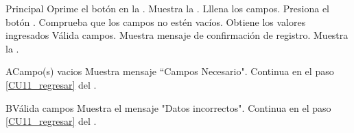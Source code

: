     \begin{UCtrayectoria}{Principal}
    \UCpaso[\UCactor] Oprime el botón  en la .
    \UCpaso Muestra la . 
    \UCpaso[\UCactor] Lllena los campos. \label{CU11_regresar}  
    \UCpaso[\UCactor] Presiona el botón .
    \UCpaso Comprueba que los campos no estén vacíos. 
    \UCpaso Obtiene los valores ingresados
    \UCpaso Válida campos. 
    \UCpaso Muestra mensaje de confirmación de registro.
    \UCpaso Muestra la .
\end{UCtrayectoria}

\begin{UCtrayectoriaA}{A}{Campo(s) vacios}
\UCpaso Muestra mensaje “Campos Necesario".
\UCpaso Continua en el paso \ref{CU11_regresar} del .
\end{UCtrayectoriaA}

\begin{UCtrayectoriaA}{B}{Válida campos}
\UCpaso Muestra el mensaje "Datos incorrectos".
\UCpaso Continua en el paso \ref{CU11_regresar} del .
\end{UCtrayectoriaA}


	


